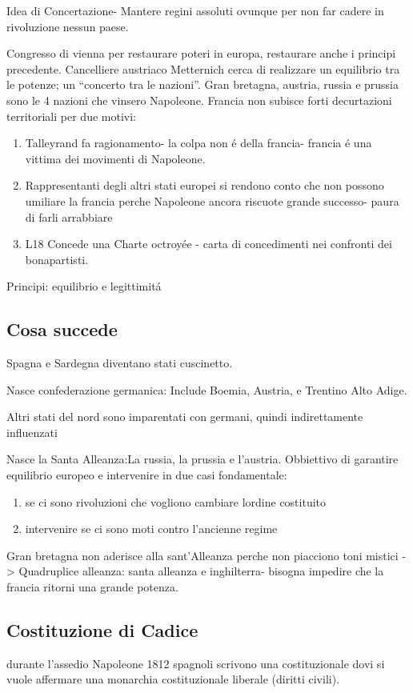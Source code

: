 \documentclass{article}
\begin{document}
Idea di Concertazione- Mantere regini assoluti ovunque per non far cadere in rivoluzione nessun paese.

Congresso di vienna per restaurare poteri in europa, restaurare anche i principi precedente. Cancelliere austriaco Metternich cerca di realizzare un equilibrio tra le potenze; un ``concerto tra le nazioni''. Gran bretagna, austria, russia e prussia sono le 4 nazioni che vinsero Napoleone. Francia non subisce forti decurtazioni territoriali per due motivi:

\begin{enumerate}
    \item Talleyrand fa ragionamento- la colpa non é della francia- francia é una vittima dei movimenti di Napoleone.
    \item Rappresentanti degli altri stati europei si rendono conto che non possono umiliare la francia perche Napoleone ancora riscuote grande successo- paura di farli arrabbiare
    \item L18 Concede una Charte octroyée - carta di concedimenti nei confronti dei bonapartisti.
\end{enumerate}

Principi: equilibrio e legittimitá
\subsection{Cosa succede}
Spagna e Sardegna diventano stati cuscinetto.

Nasce confederazione germanica: Include Boemia, Austria, e Trentino Alto Adige.

Altri stati del nord sono imparentati con germani, quindi indirettamente influenzati

Nasce la Santa Alleanza:La russia, la prussia e l'austria. Obbiettivo di garantire equilibrio europeo e intervenire in due casi fondamentale:
\begin{enumerate}
    \item se ci sono rivoluzioni che vogliono cambiare lordine costituito
    \item intervenire se ci sono moti contro l'ancienne regime
\end{enumerate}
Gran bretagna non aderisce alla sant'Alleanza perche non piacciono toni mistici -> Quadruplice alleanza: santa alleanza e inghilterra- bisogna impedire che la francia ritorni una grande potenza.

\subsection{Costituzione di Cadice}
durante l'assedio Napoleone 1812 spagnoli scrivono una costituzionale dovi si vuole affermare una monarchia costituzionale liberale (diritti civili).
\end{document}
